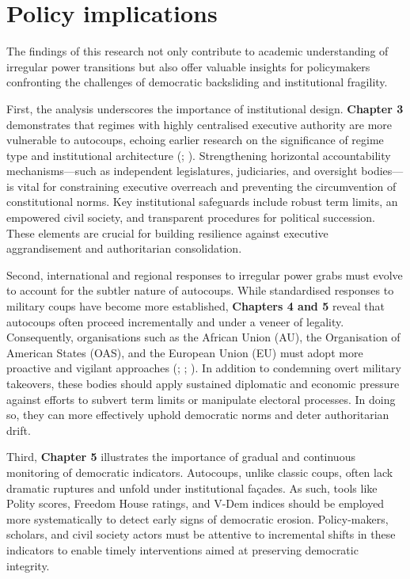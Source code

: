 \documentclass[
  12pt,
]{report}
\begin{document}
\section{Policy implications}\label{policy-implications-1}

The findings of this research not only contribute to academic
understanding of irregular power transitions but also offer valuable
insights for policymakers confronting the challenges of democratic
backsliding and institutional fragility.

First, the analysis underscores the importance of institutional design.
\textbf{Chapter 3} demonstrates that regimes with highly centralised
executive authority are more vulnerable to autocoups, echoing earlier
research on the significance of regime type and institutional
architecture (;
). Strengthening
horizontal accountability mechanisms---such as independent legislatures,
judiciaries, and oversight bodies---is vital for constraining executive
overreach and preventing the circumvention of constitutional norms. Key
institutional safeguards include robust term limits, an empowered civil
society, and transparent procedures for political succession. These
elements are crucial for building resilience against executive
aggrandisement and authoritarian consolidation.

Second, international and regional responses to irregular power grabs
must evolve to account for the subtler nature of autocoups. While
standardised responses to military coups have become more established,
\textbf{Chapters 4 and 5} reveal that autocoups often proceed
incrementally and under a veneer of legality. Consequently,
organisations such as the African Union (AU), the Organisation of
American States (OAS), and the European Union (EU) must adopt more
proactive and vigilant approaches (;
;
). In addition to
condemning overt military takeovers, these bodies should apply sustained
diplomatic and economic pressure against efforts to subvert term limits
or manipulate electoral processes. In doing so, they can more
effectively uphold democratic norms and deter authoritarian drift.

Third, \textbf{Chapter 5} illustrates the importance of gradual and
continuous monitoring of democratic indicators. Autocoups, unlike
classic coups, often lack dramatic ruptures and unfold under
institutional façades. As such, tools like Polity scores, Freedom House
ratings, and V-Dem indices should be employed more systematically to
detect early signs of democratic erosion. Policy-makers, scholars, and
civil society actors must be attentive to incremental shifts in these
indicators to enable timely interventions aimed at preserving democratic
integrity.
\end{document}
